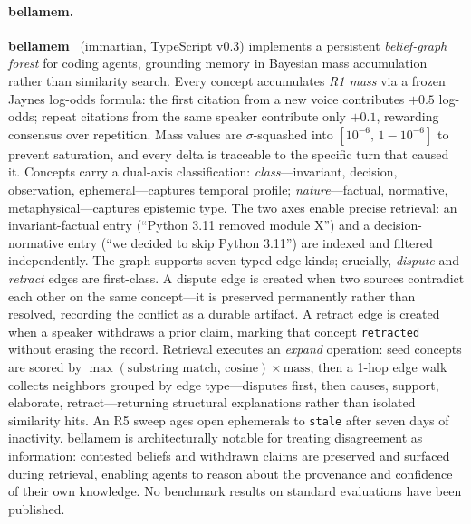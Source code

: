 \paragraph{bellamem.}
\textbf{bellamem}~\cite{bellamem2026} (immartian, TypeScript v0.3)
implements a persistent \emph{belief-graph forest} for coding agents,
grounding memory in Bayesian mass accumulation rather than similarity
search.  Every concept accumulates \emph{R1 mass} via a frozen
Jaynes log-odds formula: the first citation from a new voice contributes
$+0.5$ log-odds; repeat citations from the same speaker contribute only
$+0.1$, rewarding consensus over repetition.  Mass values are
$\sigma$-squashed into $[10^{-6},\,1-10^{-6}]$ to prevent saturation,
and every delta is traceable to the specific turn that caused it.
Concepts carry a dual-axis classification: \emph{class}---invariant,
decision, observation, ephemeral---captures temporal profile;
\emph{nature}---factual, normative, metaphysical---captures epistemic
type.  The two axes enable precise retrieval: an invariant-factual
entry (``Python 3.11 removed module X'') and a decision-normative entry
(``we decided to skip Python 3.11'') are indexed and filtered
independently.  The graph supports seven typed edge kinds; crucially,
\emph{dispute} and \emph{retract} edges are first-class.  A dispute
edge is created when two sources contradict each other on the same
concept---it is preserved permanently rather than resolved, recording
the conflict as a durable artifact.  A retract edge is created when a
speaker withdraws a prior claim, marking that concept
\texttt{retracted} without erasing the record.  Retrieval executes an
\emph{expand} operation: seed concepts are scored by
$\max(\text{substring match, cosine}) \times \text{mass}$, then a
1-hop edge walk collects neighbors grouped by edge type---disputes
first, then causes, support, elaborate, retract---returning structural
explanations rather than isolated similarity hits.  An R5 sweep ages
open ephemerals to \texttt{stale} after seven days of inactivity.
bellamem is architecturally notable for treating disagreement as
information: contested beliefs and withdrawn claims are preserved and
surfaced during retrieval, enabling agents to reason about the
provenance and confidence of their own knowledge.  No benchmark results
on standard evaluations have been published.

